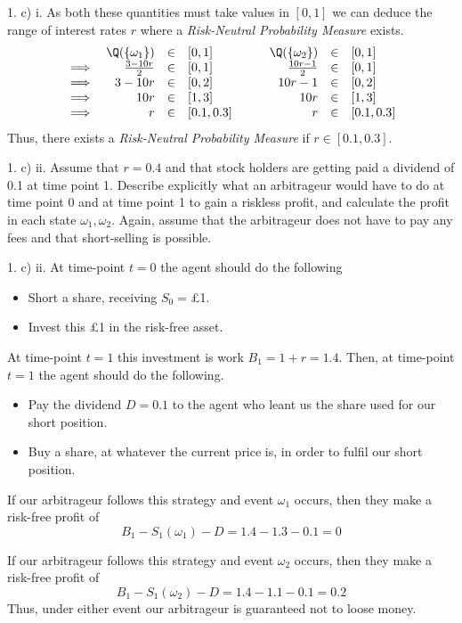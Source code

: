 \documentclass[11pt,a4paper]{article}
\begin{document}
\begin{answer}{1. c) i.}
  As both these quantities must take values in $[0,1]$ we can deduce the range of interest rates $r$ where a \textit{Risk-Neutral Probability Measure} exists.
  \[\begin{array}{rrclcrcl}
    &\Q(\{\omega_1\})&\in&[0,1]&\quad&\Q(\{\omega_2\})&\in&[0,1]\\
    \implies&\frac{3-10r}{2}&\in&[0,1]&\quad&\frac{10r-1}2&\in&[0,1]\\
    \implies&3-10r&\in&[0,2]&\quad&10r-1&\in&[0,2]\\
    \implies&10r&\in&[1,3]&\quad&10r&\in&[1,3]\\
    \implies&r&\in&[0.1,0.3]&\quad&r&\in&[0.1,0.3]
  \end{array}\]
  Thus, there exists a \textit{Risk-Neutral Probability Measure} if $r\in[0.1,0.3]$.
\end{answer}

\begin{question}{1. c) ii.}
  Assume that $r=0.4$ and that stock holders are getting paid a dividend of 0.1 at time point 1. Describe explicitly what an arbitrageur would have to do at time point 0 and at time point 1 to gain a riskless profit, and calculate the profit in each state $\omega_1,\omega_2$. Again, assume that the arbitrageur does not have to pay any fees and that short-selling is possible.
\end{question}

\begin{answer}{1. c) ii.}
  At time-point $t=0$ the agent should do the following
  \begin{itemize}
    \item Short a share, receiving $S_0=$£1.
    \item Invest this £1 in the risk-free asset.
  \end{itemize}
  At time-point $t=1$ this investment is work $B_1=1+r=1.4$.
  Then, at time-point $t=1$ the agent should do the following.
  \begin{itemize}
    \item Pay the dividend $D=0.1$ to the agent who leant us the share used for our short position.
    \item Buy a share, at whatever the current price is, in order to fulfil our short position.
  \end{itemize}
  If our arbitrageur follows this strategy and event $\omega_1$ occurs, then they make a risk-free profit of
  \[ B_1-S_1(\omega_1)-D=1.4-1.3-0.1=0 \]
  \par If our arbitrageur follows this strategy and event $\omega_2$ occurs, then they make a risk-free profit of
  \[ B_1-S_1(\omega_2)-D=1.4-1.1-0.1=0.2 \]
  Thus, under either event our arbitrageur is guaranteed not to loose money.
\end{answer}
\end{document}
